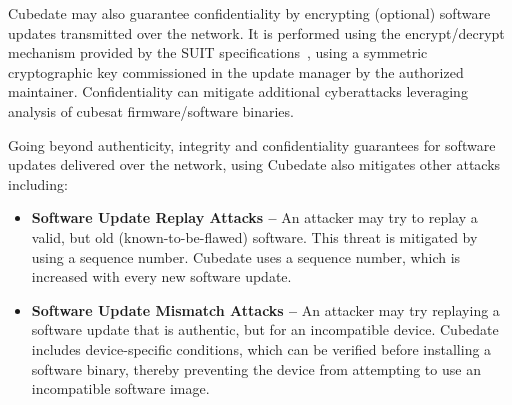 Cubedate may also guarantee confidentiality by encrypting (optional) software updates transmitted over the network.
It is performed using the encrypt/decrypt mechanism provided by the SUIT specifications~\cite{suit-firmware-encryption}, using a symmetric cryptographic key commissioned in the update manager by the authorized maintainer. 
Confidentiality can mitigate additional cyberattacks leveraging analysis of cubesat firmware/software binaries.

Going beyond authenticity, integrity and confidentiality guarantees for software updates delivered over the network, using Cubedate also mitigates other attacks including:
\begin{itemize}
\item {\bf Software Update Replay Attacks –} An attacker may try to replay a valid, but old (known-to-be-flawed) software. This threat is mitigated by using a sequence number. Cubedate uses a sequence number, which is increased with every new software update.

\item {\bf Software Update Mismatch Attacks –} An attacker may try replaying a software update that is authentic, but for an incompatible device. Cubedate includes device-specific conditions, which can be verified before installing a software binary, thereby preventing the device from attempting to use an incompatible software image.
\end{itemize}
